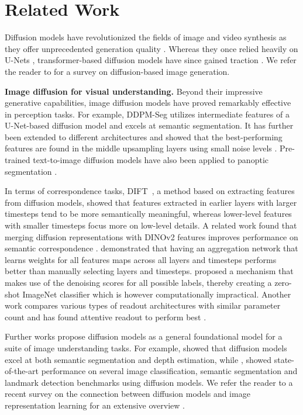 \section{Related Work}
\label{sec:related}

Diffusion models \cite{HoDenoisingDiffusionProbabilisticModels} have revolutionized the fields of image and video synthesis as they offer unprecedented generation quality \cite{karras2022elucidating, liu2024sora}.
Whereas they once relied heavily on U-Nets \cite{ronneberger2015u}, transformer-based diffusion models have since gained traction \cite{dit}.
We refer the reader to \citet{zhang2023survey} for a survey on diffusion-based image generation.

\vspace{4mm}
\noindent \textbf{Image diffusion for visual understanding.} Beyond their impressive generative capabilities, image diffusion models have proved remarkably effective in perception tasks.
For example, DDPM-Seg \cite{baranchuk2022} utilizes intermediate features of a U-Net-based diffusion model and excels at semantic segmentation.
It has further been extended to different architectures and showed that the best-performing features are found in the middle upsampling layers using small noise levels \cite{xiang2023}.
Pre-trained text-to-image diffusion models have also been applied to panoptic segmentation \cite{xu2023}.

In terms of correspondence tasks, DIFT~\cite{tang2023}, a method based on extracting features from diffusion models, showed that features extracted in earlier layers with larger timesteps tend to be more semantically meaningful, whereas lower-level features with smaller timesteps focus more on low-level details.
A related work found that merging diffusion representations with DINOv2 \cite{oquab2024} features improves performance on semantic correspondence \cite{zhang2024}.
\citet{luo2023dhf} demonstrated that having an aggregation network that learns weights for all features maps across all layers and timesteps performs better than manually selecting layers and timesteps. 
\citet{clark2024text} proposed a mechanism that makes use of the denoising scores for all possible labels,
thereby creating a zero-shot ImageNet classifier which is however computationally impractical.
Another work compares various types of readout architectures with similar parameter count and has found attentive readout to perform best \cite{mukhopadhyay2023}.

Further works propose diffusion models as a general foundational model for a suite of image understanding tasks.
For example, \citet{zhao2023} showed that diffusion models excel at both semantic segmentation and depth estimation, while \citet{yang2023}, showed state-of-the-art performance on several image classification, semantic segmentation and landmark detection benchmarks using diffusion models.
We refer the reader to a recent survey on the connection between diffusion models and image representation learning for an extensive overview \cite{fuest2024diffusion}.


